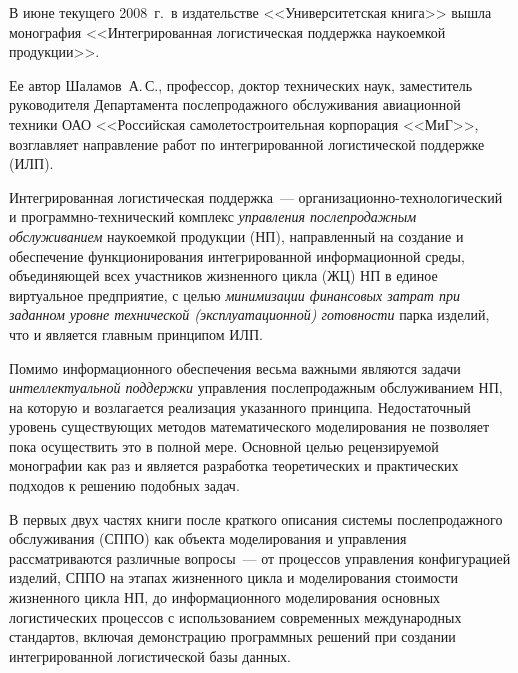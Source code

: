      \begin{multicols}{2}
     {\small

     В июне текущего 2008~г.\ в издательстве <<Университетская книга>> вышла монография
<<Интегрированная логистическая поддержка наукоемкой продукции>>.

     Ее автор Шаламов~А.\,С., профессор, доктор технических наук, заместитель
руководителя Департамента послепродажного обслуживания авиационной техники ОАО
<<Российская самолетостроительная корпорация <<МиГ>>, возглавляет направление работ по
интегрированной логистической поддержке (ИЛП).

Интегрированная логистическая поддержка~---
ор\-га\-ни\-за\-ци\-он\-но-тех\-но\-ло\-ги\-че\-ский и
про\-грам\-мно-тех\-ни\-ческий комплекс \textit{управления послепродажным
обслуживанием} наукоемкой продукции (НП), направленный на %
со\-зда\-ние и
обеспечение функционирования интегрированной информационной среды, объединяющей
всех участников жизненного цикла (ЖЦ) НП в единое виртуальное предприятие, с
целью \textit{минимизации финансовых затрат при заданном уровне технической
(эксплуатационной) готовности} парка изделий, что и является главным принципом
ИЛП.
 {

 }

     Помимо информационного обеспечения весьма важными являются задачи
\textit{интеллектуальной поддержки} управления послепродажным обслуживанием НП, на
которую и возлагается реализация указанного принципа. Недостаточный уровень существующих
методов математического моделирования не позволяет пока осуществить это в полной мере.
Основной целью рецензируемой монографии как раз и является разработка теоретических и
практических подходов к решению подобных задач.

     В первых двух частях книги после краткого описания сис\-те\-мы
     послепродажного обслуживания (СППО) как объекта моделирования
и управ\-ле\-ния рассматриваются различные вопросы~--- от процессов управления
конфигурацией изделий, СППО на  этапах жизненного цик\-ла и моделирования
стоимости жизненного цик\-ла НП, до информационного моделирования основных
логистических процессов с использованием современных международных стандартов, включая
демонстрацию программных решений при создании интегрированной логистической базы
данных.

}
\end{multicols}
